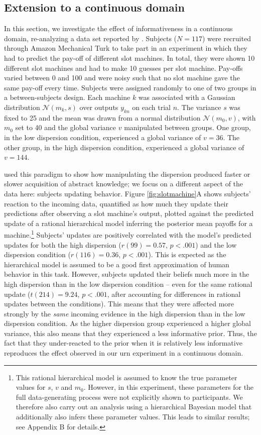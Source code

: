 \subsection{Extension to a continuous domain}

In this section, we investigate the effect of informativeness in a continuous domain, re-analyzing a data set reported by \citet{gershman2017blessing}. Subjects ($N=117$) were recruited through Amazon Mechanical Turk to take part in an experiment in which they had to predict the pay-off of different slot machines. In total, they were shown 10 different slot machines and had to make 10 guesses per slot machine. Pay-offs varied between 0 and 100 and were noisy such that no slot machine gave the same pay-off every time. Subjects were assigned randomly to one of two groups in a between-subjects design. Each machine $k$ was associated with a Gaussian distribution $\mathcal{N}(m_k,s)$ over outputs $y_{kn}$ on each trial $n$. The variance $s$ was fixed to 25 and the mean was drawn from a normal distribution $\mathcal{N}(m_0, v)$, with $m_0$ set to 40 and the global variance $v$ manipulated between groups. One group, in the low dispersion condition, experienced a global variance of $v=36$. The other group, in the high dispersion condition, experienced a global variance of $v=144$.

\cite{gershman2017blessing} used this paradigm to show how manipulating the dispersion produced faster or slower acquisition of abstract knowledge; we focus on a different aspect of the data here: subjects updating behavior. Figure \ref{fig:slotmachine}A shows subjects' reaction to the incoming data, quantified as how much they update their predictions after observing a slot machine's output, plotted against the predicted update of a rational hierarchical model inferring the posterior mean payoffs for a machine.\footnote{This rational hierarchical model is assumed to know the true parameter values for $s$, $v$ and $m_0$. However, in this experiment, these parameters for the full data-generating process were not explicitly shown to participants. We therefore also carry out an analysis using a hierarchical Bayesian model that additionally also infers these parameter values. This leads to similar results; see Appendix B for details.} Subjects' updates are positively correlated with the model's predicted updates for both the high dispersion ($r(99)=0.57$, $p<.001$) and the low dispersion condition ($r(116)=0.36$, $p<.001$). This is expected as the hierarchical model is assumed to be a good first approximation of human behavior in this task. However, subjects updated their beliefs much more in the high dispersion than in the low dispersion condition -- even for the same rational update ($t(214)=9.24$, $p<.001$, after accounting for differences in rational updates between the conditions). This means that they were affected more strongly by the \textit{same} incoming evidence in the high dispersion than in the low dispersion condition. As the higher dispersion group experienced a higher global variance, this also means that they experienced a less informative prior. Thus, the fact that they under-reacted to the prior when it is relatively less informative reproduces the effect observed in our urn experiment in a continuous domain.

